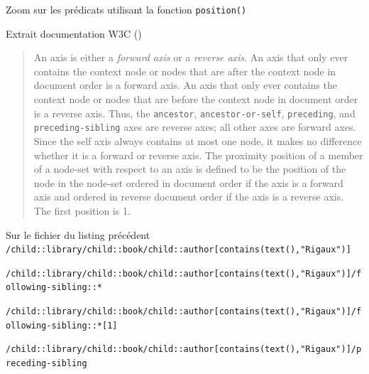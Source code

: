 \begin{frame}{Zoom sur les prédicats utilisant la fonction \texttt{position()}}

{\LARGE\Pointinghand} Extrait documentation W3C (\cite{w3c/xpath})
\begin{footnotesize}
\begin{quote}
An axis is either a \textit{forward axis} or a \textit{reverse axis}. An axis that only ever contains the context node or nodes that are after the context node in document order is a forward axis. An axis that only ever contains the context node or nodes that are before the context node in document order is a reverse axis. Thus, the \texttt{ancestor}, \texttt{ancestor-or-self}, \texttt{preceding}, and \texttt{preceding-sibling} axes are reverse axes; all other axes are forward axes. Since the self axis always contains at most one node, it makes no difference whether it is a forward or reverse axis. The proximity position of a member of a node-set with respect to an axis is defined to be the position of the node in the node-set ordered in document order if the axis is a forward axis and ordered in reverse document order if the axis is a reverse axis. The first position is 1.
\end{quote}
\end{footnotesize}

\begin{tiny}
\begin{exampleblock}{Sur le fichier du listing précédent}
\verb?/child::library/child::book/child::author[contains(text(),"Rigaux")] ?


\verb?/child::library/child::book/child::author[contains(text(),"Rigaux")]/following-sibling::* ?


\verb?/child::library/child::book/child::author[contains(text(),"Rigaux")]/following-sibling::*[1] ?


\verb?/child::library/child::book/child::author[contains(text(),"Rigaux")]/preceding-sibling ?


\end{exampleblock}
\end{tiny}
\end{frame}
